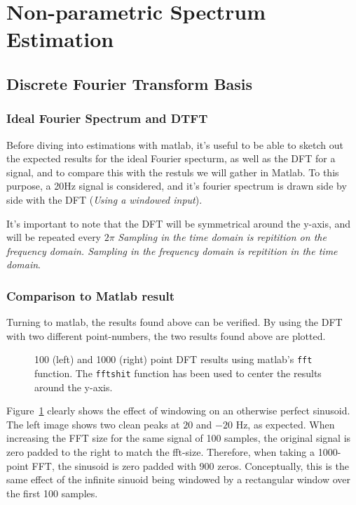 \documentclass[main.tex]{subfiles}
\begin{document}
\section{Non-parametric Spectrum Estimation}


\subsection{Discrete Fourier Transform Basis}

\subsubsection{Ideal Fourier Spectrum and DTFT}

Before diving into estimations with matlab, it's useful to be able to sketch out the expected results for the ideal Fourier specturm, as well as the DFT for a signal, and to compare this with the restuls we will gather in Matlab. To this purpose, a 20Hz signal is considered, and it's fourier spectrum is drawn side by side with the DFT (\textit{Using a windowed input}).


It's important to note that the DFT will be symmetrical around the y-axis, and will be repeated every $2\pi$ \textit{Sampling in the time domain is repitition on the frequency domain. Sampling in the frequency domain is repitition in the time domain}.


\subsubsection{Comparison to Matlab result}

Turning to matlab, the results found above can be verified. By using the DFT with two different point-numbers, the two results found above are plotted.

\begin{figure}[H]
	\centering 
	\resizebox{0.8\textwidth}{!}{}
	\caption{100 (left) and 1000 (right) point DFT results using matlab's {\tt fft} function. The {\tt fftshit} function has been used to center the results around the y-axis.}
	\label{fig:q1_1_b}
\end{figure}

Figure~\ref{fig:q1_1_b} clearly shows the effect of windowing on an otherwise perfect sinusoid. The left image shows two clean peaks at $20$ and $-20$ Hz, as expected. When increasing the FFT size for the same signal of 100 samples, the original signal is zero padded to the right to match the fft-size. Therefore, when taking a 1000-point FFT, the sinusoid is zero padded with 900 zeros. Conceptually, this is the same effect of the infinite sinuoid being windowed by a rectangular window over the first 100 samples.
\end{document}
